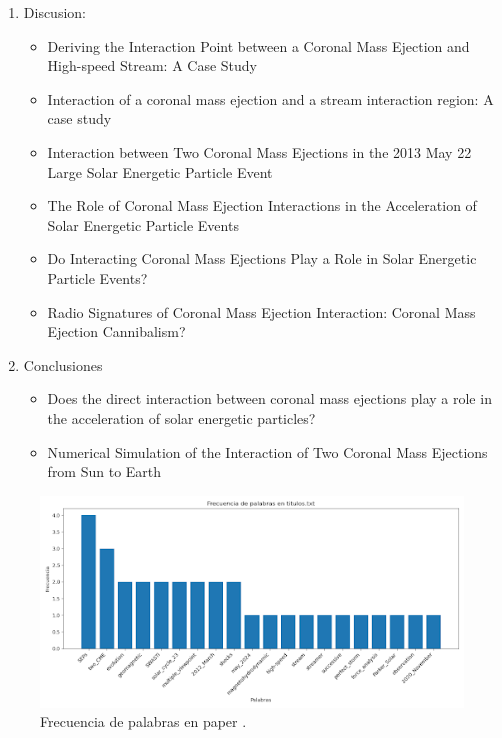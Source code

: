 \begin{enumerate}
    \item Discusion: 
    \begin{itemize}
        \item
    Deriving the Interaction Point between a Coronal Mass Ejection and High-speed Stream: A Case Study
    \item
    Interaction of a coronal mass ejection and a stream interaction region: A case study
    \item
    Interaction between Two Coronal Mass Ejections in the 2013 May 22 Large Solar Energetic Particle Event
    \item
    The Role of Coronal Mass Ejection Interactions in the Acceleration of Solar Energetic Particle Events
    \item
    Do Interacting Coronal Mass Ejections Play a Role in Solar Energetic Particle Events?
    \item
    Radio Signatures of Coronal Mass Ejection Interaction: Coronal Mass Ejection Cannibalism?
    \end{itemize}
    

    \item Conclusiones
    \begin{itemize}
         \item
    Does the direct interaction between coronal mass ejections play a role in the acceleration of solar energetic particles?

    \item Numerical Simulation of the Interaction of Two Coronal Mass Ejections from Sun to Earth
    \end{itemize}
   
\end{enumerate}

\begin{figure}[H]
    \centering
    \includegraphics[width=0.9\linewidth]{Imagenes Mein/Frecuencia palabras.png}
    \caption{Frecuencia de palabras en paper \textcite{gonzalez-esparza-2004}.}
\end{figure}